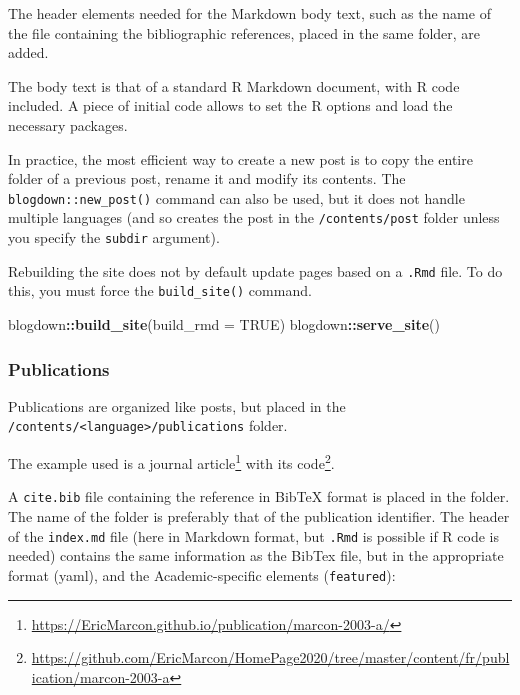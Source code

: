 \documentclass[
  12pt,
  american,
  a4paper,
  extrafontsizes,onecolumn,openright
  ]{memoir}
\newenvironment{Shaded}{\begin{snugshade}}{\end{snugshade}}
\newcommand{\AttributeTok}[1]{\textcolor[rgb]{0.13,0.29,0.53}{#1}}
\newcommand{\ConstantTok}[1]{\textcolor[rgb]{0.56,0.35,0.01}{#1}}
\newcommand{\FunctionTok}[1]{\textcolor[rgb]{0.13,0.29,0.53}{\textbf{#1}}}
\newcommand{\NormalTok}[1]{#1}
\newcommand{\SpecialCharTok}[1]{\textcolor[rgb]{0.81,0.36,0.00}{\textbf{#1}}}
\begin{document}
The header elements needed for the Markdown body text, such as the name of the file containing the bibliographic references, placed in the same folder, are added.

The body text is that of a standard R Markdown document, with R code included.
A piece of initial code allows to set the R options and load the necessary packages.

In practice, the most efficient way to create a new post is to copy the entire folder of a previous post, rename it and modify its contents.
The \texttt{blogdown::new\_post()} command can also be used, but it does not handle multiple languages (and so creates the post in the \texttt{/contents/post} folder unless you specify the \texttt{subdir} argument).

Rebuilding the site does not by default update pages based on a \texttt{.Rmd} file.
To do this, you must force the \texttt{build\_site()} command.

\scriptsize

\begin{Shaded}
\begin{Highlighting}[]
\NormalTok{blogdown}\SpecialCharTok{::}\FunctionTok{build\_site}\NormalTok{(}\AttributeTok{build\_rmd =} \ConstantTok{TRUE}\NormalTok{)}
\NormalTok{blogdown}\SpecialCharTok{::}\FunctionTok{serve\_site}\NormalTok{()}
\end{Highlighting}
\end{Shaded}

\normalsize

\subsubsection{Publications}\label{publications}

Publications are organized like posts, but placed in the \texttt{/contents/\textless{}language\textgreater{}}\break\texttt{/publications} folder.

The example used is a journal article\footnote{\url{https://EricMarcon.github.io/publication/marcon-2003-a/}} with its code\footnote{\url{https://github.com/EricMarcon/HomePage2020/tree/master/content/fr/publication/marcon-2003-a}}.

A \texttt{cite.bib} file containing the reference in BibTeX format is placed in the folder.
The name of the folder is preferably that of the publication identifier.
The header of the \texttt{index.md} file (here in Markdown format, but \texttt{.Rmd} is possible if R code is needed) contains the same information as the BibTex file, but in the appropriate format (yaml), and the Academic-specific elements (\texttt{featured}):
\end{document}
